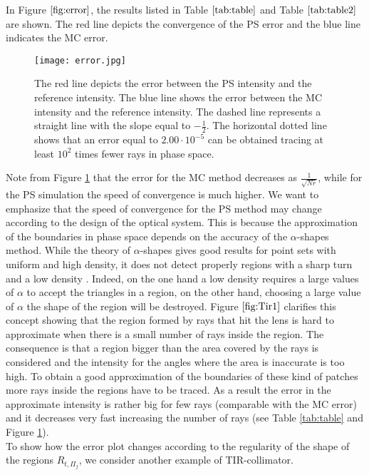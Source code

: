 \noindent In Figure $\ref{fig:error}$, the results listed in Table $\ref{tab:table}$ and Table $\ref{tab:table2}$ are shown. The red line depicts the convergence of the PS error and the blue line indicates the MC error.
\begin{figure}[h!]
  \begin{center}
  \texttt{[image: error.jpg]}
  \end{center}
  \caption{\footnotesize{ The red line depicts the error between the PS intensity and the reference intensity.
 The blue line shows the error between the MC intensity and the reference intensity.
  The dashed line represents a straight line with the slope equal to $-\frac{1}{2}$.
  The horizontal dotted line shows that an error equal to $2.00 \cdot  10^{-5}$ can be obtained tracing at least $10^2$ times fewer rays in phase space.}}
  \label{fig:error}
\end{figure}
Note from Figure \ref{fig:error} that the error for the MC method decreases as $\frac{1}{\sqrt{Nr}}$, while for the PS simulation the speed of convergence is much higher.
We want to emphasize that the speed of convergence for the PS method may change according to the design of the optical system.
This is because the approximation of the boundaries in phase space depends on the accuracy of the $\alpha$-shapes method.
While the theory of $\alpha$-shapes gives good results for point sets with uniform and high density, it does not detect properly regions with a sharp turn and a low density
\cite{teichmann1998surface}. Indeed, on the one hand a low density requires a large values of $\alpha$ to accept the triangles in a region, on the other hand,
 choosing a large value of $\alpha$ the shape of the region will be destroyed.
Figure $\ref{fig:Tir1}$ clarifies this concept showing that the region formed by rays that hit the lens is hard to approximate when there is a small number of rays inside the region. The consequence is that a region bigger than the area covered by the rays is considered and the intensity for the angles where the area is inaccurate is too high.
 To obtain a good approximation of the boundaries of these kind of patches more rays
 inside the regions have to be traced.
 As a result the error in the approximate intensity is rather big for few rays (comparable with the MC error) and it decreases very fast increasing the number of rays (see Table
 \ref{tab:table} and Figure \ref{fig:error}). \\
 \indent To show how the error plot changes according to the regularity of the shape of the regions $R_{t, \Pi_j}$, we consider another example of TIR-collimator.
